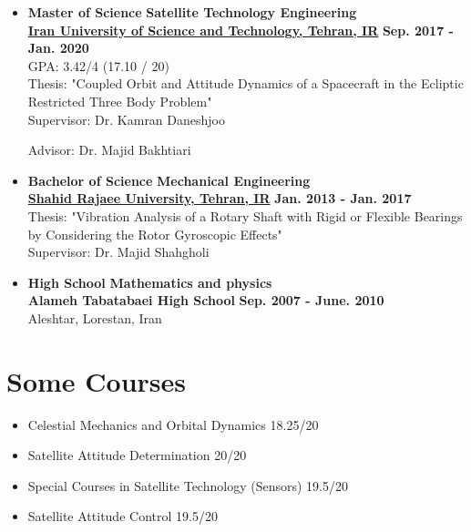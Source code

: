 \documentclass[10pt,a4paper,times]{moderncv}
\begin{document}
\begin{itemize}
	\item \textbf{Master of Science} \hfill \textbf{Satellite Technology Engineering} \\
	\href{http://www.iust.ac.ir/en}{\textbf{Iran University of Science and Technology, Tehran, IR}} \hfill \textbf{Sep. 2017 - Jan. 2020}\\ GPA: 3.42/4 (17.10 / 20) \\ Thesis: "Coupled Orbit and Attitude Dynamics of a Spacecraft in the Ecliptic Restricted Three Body Problem" \\ Supervisor: Dr. Kamran Daneshjoo
	\par 
	Advisor: Dr. Majid Bakhtiari
	\item \textbf{Bachelor of Science} \hfill \textbf{Mechanical Engineering} \\
	\href{https://sru.ac.ir/en}{\textbf{Shahid Rajaee University, Tehran, IR}} \hfill \textbf{Jan. 2013 - Jan. 2017} \\  Thesis: "Vibration Analysis of a Rotary Shaft with Rigid or Flexible Bearings by Considering the Rotor Gyroscopic Effects" \\ Supervisor: Dr. Majid Shahgholi
	
	
	\item \textbf{High School} \hfill \textbf{Mathematics and physics } \\
	{\textbf{Alameh Tabatabaei High School}} \hfill \textbf{Sep. 2007 - June. 2010} \\ Aleshtar, Lorestan, Iran   %
\end{itemize}

\section{Some Courses}
\begin{multicols}{2}  %
	\begin{itemize}
		
		\item Celestial Mechanics and Orbital Dynamics   	 	\hfill{18.25/20}
		\item Satellite Attitude Determination  					 	\hfill{20/20}              
		\item Special Courses in Satellite Technology (Sensors)             		 	\hfill{19.5/20}
		\item Satellite Attitude Control            	 	\hfill{19.5/20} 
		
	\end{itemize}
\end{multicols}
\end{document}
